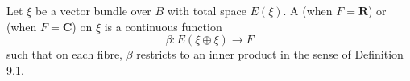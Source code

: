 Let $\xi$ be a vector bundle over $B$ with total space $E(\xi)$. A  (when $F = \mathbf{R}$) or  (when $F = \mathbf{C}$) on $\xi$ is a continuous function
$$\beta: E(\xi \oplus \xi) \rightarrow F$$
such that on each fibre, $\beta$ restricts to an inner product in the sense of Definition 9.1.
